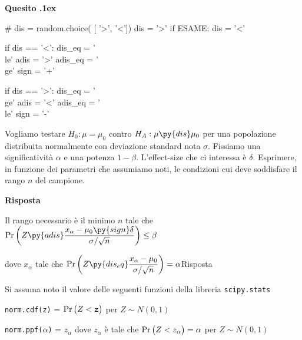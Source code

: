 \documentclass[11pt,twoside,a4paper]{article}
\def\Pr{{\rm Pr\,}}
\newcounter{quesito}
\newenvironment{question}{\bigskip\addtocounter{quesito}{1}\par\textbf{Quesito \thequesito.\kern1ex}}{\vspace{\parskip}}
\newenvironment{answer}{\par\textbf{Risposta\quad}}{\vspace{\parskip}}
\begin{document}
\clearpage
\begin{question} %
\begin{pycode}
# dis = random.choice( [ '>', '<'])
dis =  '>'
if ESAME: dis = '<'

if dis == '<':
   dis_eq  = '\\le'
   adis    = '>'
   adis_eq = '\\ge'
   sign = '+'

if dis == '>':
   dis_eq  = '\\ge'
   adis    = '<'
   adis_eq = '\\le'
   sign = '-'

\end{pycode}
Vogliamo testare $H_0:\mu=\mu_0$ contro $H_A:\mu\py{dis}\mu_0$ per una popolazione distribuita normalmente con deviazione standard nota $\sigma$. Fissiamo una significatività $\alpha$ e una potenza $1-\beta$. L'effect-size che ci interessa è $\delta$.  Esprimere, in funzione dei parametri che assumiamo noti, le condizioni cui deve soddisfare il rango $n$ del campione.

\begin{answer}

{\color{blue}Il rango necessario è il minimo $n$ tale che $\displaystyle\Pr\bigg(Z\py{adis}\frac{x_\alpha-\mu_0\py{sign}\delta}{\sigma/\sqrt{n}}\bigg)\le\beta$

dove $x_\alpha$ tale che $\displaystyle\Pr\bigg(Z\py{dis_eq} \frac{x_\alpha-\mu_0}{\sigma/\sqrt{n}}\bigg)=\alpha$\hfill Risposta}


\end{answer}

\end{question}















\vfill
\hrulefill

Si assuma noto il valore delle seguenti funzioni della libreria {\tt scipy.stats\/}

{\tt norm.cdf(z)} = $\Pr\big(Z<{\tt z}\big)$ per $Z\sim N(0,1)$ 

{\tt norm.ppf($\alpha$)} = $z_\alpha$ dove $z_\alpha$ è tale che $\Pr\big(Z<z_\alpha\big)=\alpha$ per $Z\sim N(0,1)$ 
\end{document}
